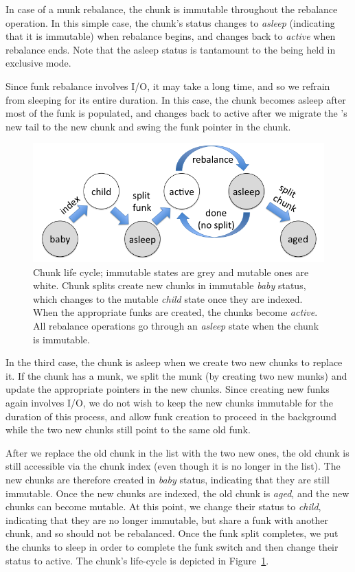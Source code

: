 In case of a munk rebalance, the chunk is immutable throughout the rebalance operation.
In this simple case, the chunk's status changes to \emph{asleep} (indicating that it is immutable)
when rebalance begins, and changes back to \emph{active} when rebalance ends. 
Note that the asleep status is tantamount to the  being held in exclusive mode.

Since funk rebalance involves I/O, it may take a long time, and so we  refrain from sleeping for its entire 
duration. In this case, the chunk becomes asleep after most of the funk is populated, and 
changes back to active after we 
migrate the 's new tail to the new chunk and swing the funk pointer in the chunk.


\begin{figure}[htb]
\centerline{
\includegraphics[width=\columnwidth]{state-diagram.png}
}
\caption{Chunk life cycle; immutable states are grey and mutable ones are white.
Chunk splits  create new chunks in immutable \emph{baby} status, which changes to the mutable \emph{child} state once they 
are indexed. When the appropriate funks are created, the chunks become \emph{active}. All rebalance operations go through an 
\emph{asleep} state when the chunk is immutable.}
\label{fig:status}
\end{figure}

In the third case, the chunk is asleep when we create two new chunks to replace it. 
If the chunk has a munk, we split the munk (by creating two new munks) and update the appropriate pointers in the new chunks.  
Since creating new funks again involves I/O, we do not wish to keep the new chunks immutable for the duration of this process,
and allow funk creation to proceed in the background while the two new chunks still point to the same old funk. 

After we replace the old chunk in the list with the two new ones, 
the old chunk is still accessible via the chunk index (even though it is no longer in the list). 
The new chunks are therefore created in \emph{baby} status, indicating that they are still immutable. 
Once the new chunks are indexed, the old chunk is \emph{aged}, and the new chunks can become mutable.
At this point, we change their status to \emph{child}, indicating that they are no longer immutable, but share a funk with another chunk,
and so should not be rebalanced. Once the funk split completes, we put the chunks to sleep in order
to complete the funk switch and then change their  status  to active. 
The chunk's life-cycle is depicted in Figure~\ref{fig:status}.

